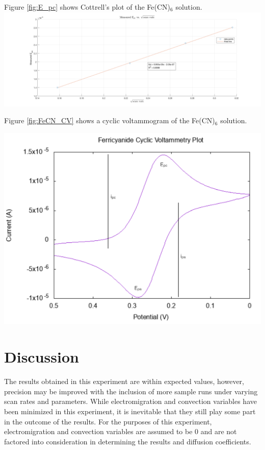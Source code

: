 \documentclass{article}
\begin{document}
\begin{multicols}{2}
{Figure \ref{fig:E_pc} shows Cottrell's plot of the Fe(CN)$_6$ solution.
\includegraphics[scale=0.1]{E_pc}
    \label{fig:E_pc}

Figure \ref{fig:FeCN_CV} shows a cyclic voltammogram of the Fe(CN)$_6$ solution.
\begin{center}
\includegraphics[scale=0.2]{FeCN_CV}
    \label{fig:FeCN_CV}
\end{center}


\section*{Discussion}
The results obtained in this experiment are within expected values,
however, precision may be improved with the inclusion of more sample runs under
varying scan rates and parameters. 
While electromigration and convection variables have been minimized in this
experiment, it is inevitable that they still play some part in the outcome of
the results. For the purposes of this experiment, electromigration and
convection variables are assumed to be 0 and are not factored into consideration
in determining the results and diffusion coefficients.

}
\end{multicols}
\end{document}
